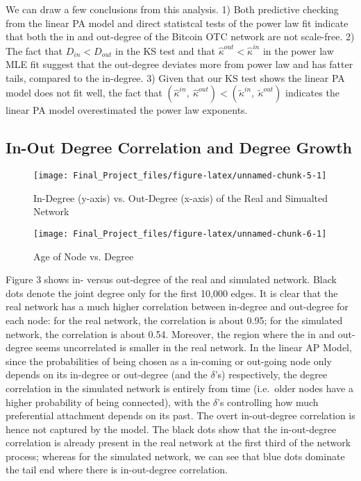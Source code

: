 \documentclass[]{elsarticle} %
\makeatletter
\def\maxwidth{\ifdim\Gin@nat@width>\linewidth\linewidth
\else\Gin@nat@width\fi}
\let\Oldincludegraphics\includegraphics
\renewcommand{\includegraphics}[1]{\Oldincludegraphics[width=\maxwidth]{#1}}
\makeatother
\begin{document}
We can draw a few conclusions from this analysis. 1) Both predictive
checking from the linear PA model and direct statistcal tests of the
power law fit indicate that both the in and out-degree of the Bitcoin
OTC network are not scale-free. 2) The fact that \(D_{in} < D_{out}\) in
the KS test and that \(\hat{\kappa}^{out} < \hat{\kappa}^{in}\) in the
power law MLE fit suggest that the out-degree deviates more from power
law and has fatter tails, compared to the in-degree. 3) Given that our
KS test shows the linear PA model does not fit well, the fact that
\((\hat{\kappa}^{in}, \  \hat{\kappa}^{out}) < (\tilde{\kappa}^{in}, \ \tilde{\kappa}^{out})\)
indicates the linear PA model overestimated the power law exponents.

\subsection{In-Out Degree Correlation and Degree
Growth}\label{in-out-degree-correlation-and-degree-growth}

\begin{figure}

{\centering \texttt{[image: Final\_Project\_files/figure-latex/unnamed-chunk-5-1]} 

}

\caption{In-Degree (y-axis) vs. Out-Degree (x-axis) of the Real and Simualted Network}\label{fig:unnamed-chunk-5}
\end{figure}

\begin{figure}

{\centering \texttt{[image: Final\_Project\_files/figure-latex/unnamed-chunk-6-1]} 

}

\caption{Age of Node vs. Degree}\label{fig:unnamed-chunk-6}
\end{figure}

Figure 3 shows in- versus out-degree of the real and simulated network.
Black dots denote the joint degree only for the first 10,000 edges. It
is clear that the real network has a much higher correlation between
in-degree and out-degree for each node: for the real network, the
correlation is about 0.95; for the simulated network, the correlation is
about 0.54. Moreover, the region where the in and out-degree seems
uncorrelated is smaller in the real network. In the linear AP Model,
since the probabilities of being chosen as a in-coming or out-going node
only depends on its in-degree or out-degree (and the \(\delta\)'s)
respectively, the degree correlation in the simulated network is
entirely from time (i.e.~older nodes have a higher probability of being
connected), with the \(\delta\)'s controlling how much preferential
attachment depends on its past. The overt in-out-degree correlation is
hence not captured by the model. The black dots show that the
in-out-degree correlation is already present in the real network at the
first third of the network process; whereas for the simulated network,
we can see that blue dots dominate the tail end where there is
in-out-degree correlation.
\end{document}
